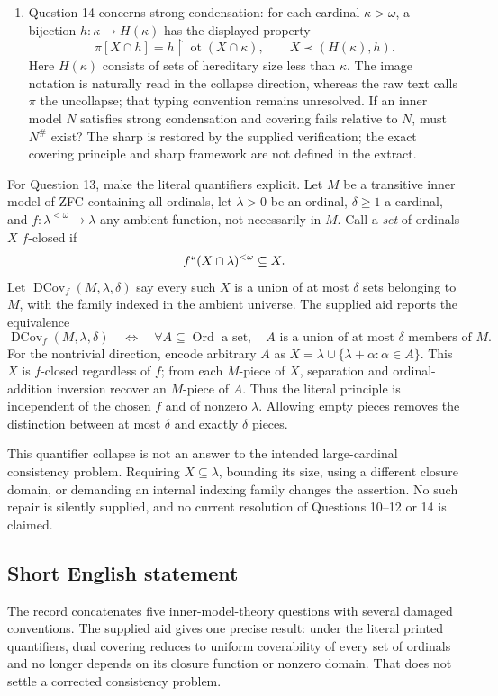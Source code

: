 \documentclass[11pt]{article}
\begin{document}
\begin{enumerate}
\item Question 14 concerns strong condensation: for each cardinal \(\kappa>\omega\), a bijection \(h:\kappa\to H(\kappa)\) has the displayed property
\[
\pi[X\cap h]=h\upharpoonright\operatorname{ot}(X\cap\kappa),\qquad
X\prec(H(\kappa),h).
\]
Here \(H(\kappa)\) consists of sets of hereditary size less than \(\kappa\). The image notation is naturally read in the collapse direction, whereas the raw text calls \(\pi\) the uncollapse; that typing convention remains unresolved. If an inner model \(N\) satisfies strong condensation and covering fails relative to \(N\), must \(N^\#\) exist? The sharp is restored by the supplied verification; the exact covering principle and sharp framework are not defined in the extract.
\end{enumerate}

For Question 13, make the literal quantifiers explicit. Let \(M\) be a transitive inner model of ZFC containing all ordinals, let \(\lambda>0\) be an ordinal, \(\delta\geq1\) a cardinal, and \(f:\lambda^{<\omega}\to\lambda\) any ambient function, not necessarily in \(M\). Call a \emph{set} of ordinals \(X\) \(f\)-closed if
\[
f``(X\cap\lambda)^{<\omega}\subseteq X.
\]
Let \(\operatorname{DCov}_f(M,\lambda,\delta)\) say every such \(X\) is a union of at most \(\delta\) sets belonging to \(M\), with the family indexed in the ambient universe. The supplied aid reports the equivalence
\[
\operatorname{DCov}_f(M,\lambda,\delta)
\quad\Longleftrightarrow\quad
\forall A\subseteq\operatorname{Ord}\text{ a set},\quad
A\text{ is a union of at most }\delta\text{ members of }M.
\]
For the nontrivial direction, encode arbitrary \(A\) as \(X=\lambda\cup\{\lambda+\alpha:\alpha\in A\}\). This \(X\) is \(f\)-closed regardless of \(f\); from each \(M\)-piece of \(X\), separation and ordinal-addition inversion recover an \(M\)-piece of \(A\). Thus the literal principle is independent of the chosen \(f\) and of nonzero \(\lambda\). Allowing empty pieces removes the distinction between at most \(\delta\) and exactly \(\delta\) pieces.

This quantifier collapse is not an answer to the intended large-cardinal consistency problem. Requiring \(X\subseteq\lambda\), bounding its size, using a different closure domain, or demanding an internal indexing family changes the assertion. No such repair is silently supplied, and no current resolution of Questions 10--12 or 14 is claimed.
\subsection{Short English statement}
The record concatenates five inner-model-theory questions with several damaged conventions. The supplied aid gives one precise result: under the literal printed quantifiers, dual covering reduces to uniform coverability of every set of ordinals and no longer depends on its closure function or nonzero domain. That does not settle a corrected consistency problem.
\end{document}
